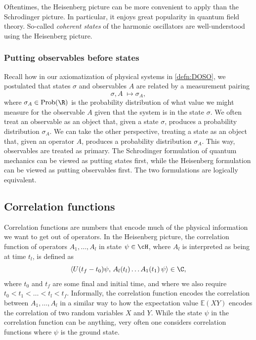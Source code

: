 Oftentimes, the Heisenberg picture can be more convenient to apply than the Schrodinger picture. In particular, it enjoys great popularity in quantum field theory. So-called \emph{coherent states} of the harmonic oscillators are well-understood using the Heisenberg picture.

\subsubsection{Putting observables before states}
Recall how in our axiomatization of physical systems in \ref{defn:DOSO}, we postulated that states $\sigma$ and observables $A$ are related by a measurement pairing
\begin{equation*}
    \sigma, A \;\longmapsto \sigma_A,
\end{equation*}
where $\sigma_A \in \text{Prob}(\R)$ is the probability distribution of what value we might measure for the observable $A$ given that the system is in the state $\sigma$. We often treat an observable as an object that, given a state $\sigma$, produces a probability distribution $\sigma_A$. We can take the other perspective, treating a state as an object that, given an operator $A$, produces a probability distribution $\sigma_A$. This way, observables are treated as primary. The Schrodinger formulation of quantum mechanics can be viewed as putting states first, while the Heisenberg formulation can be viewed as putting observables first. The two formulations are logically equivalent.


\subsection{Correlation functions}
Correlation functions are numbers that encode much of the physical information we want to get out of operators. In the Heisenberg picture, the correlation function of operators $A_1, \dots, A_l$ in state $\psi \in \cH$, where $A_l$ is interpreted as being at time $t_l$, is defined as
\begin{equation*}
    \langle U(t_f - t_0) \psi, \, A_l(t_l) \dots A_1(t_1) \, \psi \rangle \in \C,
\end{equation*}
where $t_0$ and $t_f$ are some final and initial time, and where we also require $t_0 < t_1 < \dots < t_l < t_f$. Informally, the correlation function encodes the correlation between $A_1, \dots, A_l$ in a similar way to how the expectation value $\mathbb{E}(X Y)$ encodes the correlation of two random variables $X$ and $Y$. While the state $\psi$ in the correlation function can be anything, very often one considers correlation functions where $\psi$ is the ground state.

